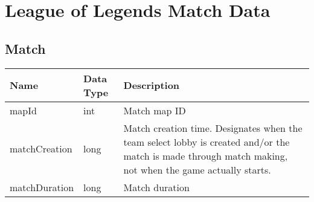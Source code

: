 \section{League of Legends Match Data}\label{sec:matchdata}

\subsection{Match}
\begin{table}[!htb]
\tiny
\centering
\begin{tabular}{|llp{5cm}|}
\hline
\textbf{Name}         & \textbf{Data Type}& \textbf{Description} \\ 
\hline
  mapId                 & int              & Match map ID                                                                                                                                                                                                                                                                                                                                                                                                                                                                                                                                                                                                                            \\ \hline
matchCreation         & long                          & Match creation time. Designates when the team select lobby is created and/or the match is made through match making, not when the game actually starts.                                                                                                                                                                                                                                                                                                                                                                                                                                                                                 \\ \hline
matchDuration         & long                          & Match duration                                                                                                                                                                                                                                                                                                                                                                                                                                                                                                                                                                                                                          \\ \hline

\end{tabular}
\end{table}
